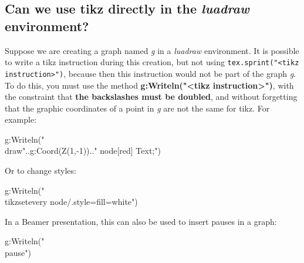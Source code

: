 \subsection{Can we use tikz directly in the \emph{luadraw} environment?}

Suppose we are creating a graph named \emph{g} in a \emph{luadraw} environment. It is possible to write a tikz instruction during this creation, but not using \verb|tex.sprint("<tikz instruction>")|, because then this instruction would not be part of the graph \emph{g}. To do this, you must use the method \textbf{g:Writeln("<tikz instruction>")}, with the constraint that \textbf{the backslashes must be doubled}, and without forgetting that the graphic coordinates of a point in \emph{g} are not the same for tikz. For example:
\begin{Luacode}
g:Writeln("\\draw"..g:Coord(Z(1,-1)).." node[red] {Text};")
\end{Luacode}

Or to change styles:
\begin{Luacode}
g:Writeln("\\tikzset{every node/.style={fill=white}}")
\end{Luacode}

In a Beamer presentation, this can also be used to insert pauses in a graph:
\begin{Luacode}
g:Writeln("\\pause")
\end{Luacode}
